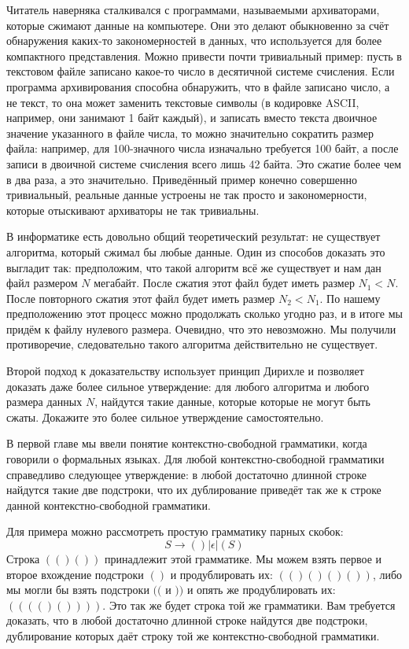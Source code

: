 \begin{exercise}
Читатель наверняка сталкивался с программами, называемыми архиваторами, которые сжимают данные на компьютере. Они это делают обыкновенно за счёт обнаружения каких-то закономерностей в данных, что используется для более компактного представления.  Можно привести почти тривиальный пример: пусть в текстовом файле записано какое-то число в десятичной системе счисления. Если программа архивирования способна обнаружить, что в файле записано число, а не текст, то она может заменить текстовые символы (в кодировке ASCII, например, они занимают 1 байт каждый), и записать вместо текста двоичное значение указанного в файле числа, то можно значительно сократить размер файла: например, для 100-значного числа изначально требуется 100 байт, а после записи в двоичной системе счисления всего лишь 42 байта. Это сжатие более чем в два раза, а это значительно. Приведённый пример конечно совершенно тривиальный, реальные данные устроены не так просто и закономерности, которые отыскивают архиваторы не так тривиальны.

В информатике есть довольно общий теоретический результат: не существует алгоритма, который сжимал бы любые данные. Один из способов доказать это выгладит так: предположим, что такой алгоритм всё же существует и нам дан файл размером $N$ мегабайт. После сжатия этот файл будет иметь размер $N_1 < N$. После повторного сжатия этот файл будет иметь размер $N_2 < N_1$. По нашему предположению этот процесс можно продолжать сколько угодно раз, и в итоге мы придём к файлу нулевого размера. Очевидно, что это невозможно. Мы получили противоречие, следовательно такого алгоритма действительно не существует.

Второй подход к доказательству использует принцип Дирихле и позволяет доказать даже более сильное утверждение: для любого алгоритма и любого размера данных $N$, найдутся такие данные, которые которые не могут быть сжаты. Докажите это более сильное утверждение самостоятельно.
\end{exercise}

\begin{exercise}
В первой главе мы ввели понятие контекстно-свободной грамматики, когда говорили о формальных языках. Для любой контекстно-свободной грамматики справедливо следующее утверждение: в любой достаточно длинной строке найдутся такие две подстроки, что их дублирование приведёт так же к строке данной контекстно-свободной грамматики.

Для примера можно рассмотреть простую грамматику парных скобок:
$$S \to () | \epsilon | (S)$$
Строка $(()())$ принадлежит этой грамматике. Мы можем взять первое и второе вхождение подстроки $()$ и продублировать их: $(()()()())$, либо мы могли бы взять подстроки $(($ и $))$ и опять же продублировать их: $(((()())))$. Это так же будет строка той же грамматики. Вам требуется доказать, что в любой достаточно длинной строке найдутся две подстроки, дублирование которых даёт строку той же контекстно-свободной грамматики.
\end{exercise}

